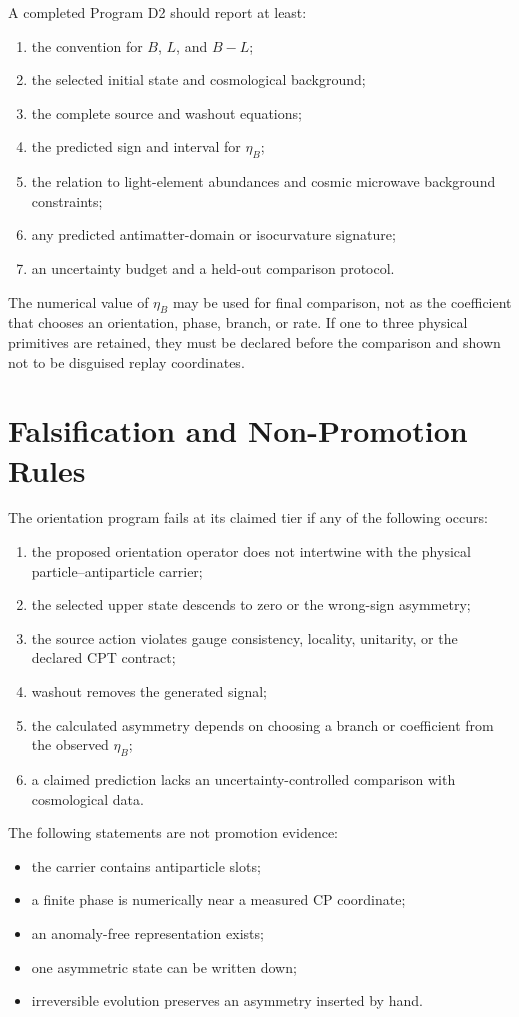 \documentclass[11pt]{article}
\theoremstyle{definition}
\theoremstyle{remark}
\begin{document}
A completed Program D2 should report at least:
\begin{enumerate}[label=\textbf{O\arabic*.}]
\item the convention for $B$, $L$, and $B-L$;
\item the selected initial state and cosmological background;
\item the complete source and washout equations;
\item the predicted sign and interval for $\eta_B$;
\item the relation to light-element abundances and cosmic microwave
background constraints;
\item any predicted antimatter-domain or isocurvature signature;
\item an uncertainty budget and a held-out comparison protocol.
\end{enumerate}

The numerical value of $\eta_B$ may be used for final comparison, not as the
coefficient that chooses an orientation, phase, branch, or rate.  If one to
three physical primitives are retained, they must be declared before the
comparison and shown not to be disguised replay coordinates.

\section{Falsification and Non-Promotion Rules}

The orientation program fails at its claimed tier if any of the following
occurs:
\begin{enumerate}[label=\textbf{F\arabic*.}]
\item the proposed orientation operator does not intertwine with the physical
particle--antiparticle carrier;
\item the selected upper state descends to zero or the wrong-sign asymmetry;
\item the source action violates gauge consistency, locality, unitarity, or
the declared CPT contract;
\item washout removes the generated signal;
\item the calculated asymmetry depends on choosing a branch or coefficient
from the observed $\eta_B$;
\item a claimed prediction lacks an uncertainty-controlled comparison with
cosmological data.
\end{enumerate}

The following statements are not promotion evidence:
\begin{itemize}
\item the carrier contains antiparticle slots;
\item a finite phase is numerically near a measured CP coordinate;
\item an anomaly-free representation exists;
\item one asymmetric state can be written down;
\item irreversible evolution preserves an asymmetry inserted by hand.
\end{itemize}
\end{document}
